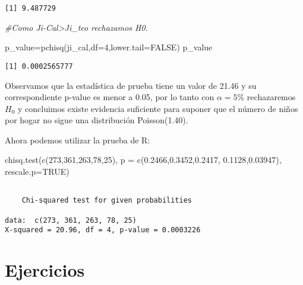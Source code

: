 \documentclass[
  a4paper,
  oneside,
  openany]{book}
\newenvironment{Shaded}{\begin{snugshade}}{\end{snugshade}}
\newcommand{\AttributeTok}[1]{\textcolor[rgb]{0.77,0.63,0.00}{#1}}
\newcommand{\CommentTok}[1]{\textcolor[rgb]{0.56,0.35,0.01}{\textit{#1}}}
\newcommand{\ConstantTok}[1]{\textcolor[rgb]{0.00,0.00,0.00}{#1}}
\newcommand{\DecValTok}[1]{\textcolor[rgb]{0.00,0.00,0.81}{#1}}
\newcommand{\FloatTok}[1]{\textcolor[rgb]{0.00,0.00,0.81}{#1}}
\newcommand{\FunctionTok}[1]{\textcolor[rgb]{0.00,0.00,0.00}{#1}}
\newcommand{\NormalTok}[1]{#1}
\newcommand{\OtherTok}[1]{\textcolor[rgb]{0.56,0.35,0.01}{#1}}
\begin{document}
\begin{verbatim}
[1] 9.487729
\end{verbatim}

\begin{Shaded}
\begin{Highlighting}[]
\CommentTok{\#Como Ji{-}Cal\textgreater{}Ji\_teo rechazamos H0.}

\NormalTok{p\_value}\OtherTok{=}\FunctionTok{pchisq}\NormalTok{(ji\_cal,}\AttributeTok{df=}\DecValTok{4}\NormalTok{,}\AttributeTok{lower.tail=}\ConstantTok{FALSE}\NormalTok{)}
\NormalTok{p\_value}
\end{Highlighting}
\end{Shaded}

\begin{verbatim}
[1] 0.0002565777
\end{verbatim}

Observamos que la estadística de prueba tiene un valor de 21.46 y su correspondiente p-value es menor a 0.05, por lo tanto con \(\alpha=5\%\) rechazaremos \(H_0\) y concluimos existe evidencia suficiente para suponer que el número de niños por hogar no sigue una distribución Poisson(1.40).

Ahora podemos utilizar la prueba de R:

\begin{Shaded}
\begin{Highlighting}[]
\FunctionTok{chisq.test}\NormalTok{(}\FunctionTok{c}\NormalTok{(}\DecValTok{273}\NormalTok{,}\DecValTok{361}\NormalTok{,}\DecValTok{263}\NormalTok{,}\DecValTok{78}\NormalTok{,}\DecValTok{25}\NormalTok{), }\AttributeTok{p =} \FunctionTok{c}\NormalTok{(}\FloatTok{0.2466}\NormalTok{,}\FloatTok{0.3452}\NormalTok{,}\FloatTok{0.2417}\NormalTok{,}
                                       \FloatTok{0.1128}\NormalTok{,}\FloatTok{0.03947}\NormalTok{), }\AttributeTok{rescale.p=}\ConstantTok{TRUE}\NormalTok{)}
\end{Highlighting}
\end{Shaded}

\begin{verbatim}

    Chi-squared test for given probabilities

data:  c(273, 361, 263, 78, 25)
X-squared = 20.96, df = 4, p-value = 0.0003226
\end{verbatim}

\hypertarget{ejercicios-10}{%
\section{Ejercicios}\label{ejercicios-10}}
\end{document}
